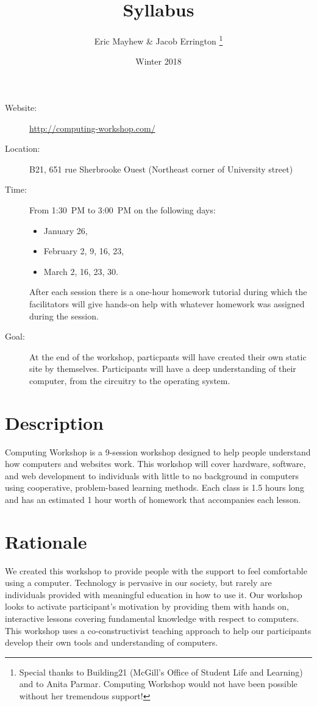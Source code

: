 \documentclass[11pt]{article}
\author{%
  Eric Mayhew \& Jacob Errington%
  \footnote{%
    Special thanks to Building21 (McGill's Office of Student Life and Learning)
    and to Anita Parmar.
    Computing Workshop would not have been possible without her tremendous
    support!
  }
}
\title{Syllabus}
\date{Winter 2018}
\begin{document}
\maketitle

\begin{description}
  \item[Website:]
    \url{http://computing-workshop.com/}

  \item[Location:]
    B21, 651 rue Sherbrooke Ouest
    (Northeast corner of University street)

  \item[Time:]
    From 1:30~PM to 3:00~PM on the following days:
    \begin{itemize}
      \item January 26,
      \item February 2, 9, 16, 23,
      \item March 2, 16, 23, 30.
    \end{itemize}

    After each session there is a one-hour homework tutorial during which the
    facilitators will give hands-on help with whatever homework was assigned
    during the session.

  \item[Goal:]
    At the end of the workshop, particpants will have created their own static
    site by themselves. Participants will have a deep understanding of their
    computer, from the circuitry to the operating system.
\end{description}

\section*{Description}

Computing Workshop is a 9-session workshop designed to help people understand
how computers and websites work. This workshop will cover hardware, software,
and web development to individuals with little to no background in computers
using cooperative, problem-based learning methods. Each class is 1.5 hours long
and has an estimated 1 hour worth of homework that accompanies each lesson.

\section*{Rationale}

We created this workshop to provide people with the support to feel comfortable
using a computer. Technology is pervasive in our society, but rarely are
individuals provided with meaningful education in how to use it. Our workshop
looks to activate participant's motivation by providing them with hands on,
interactive lessons covering fundamental knowledge with respect to computers.
This workshop uses a co-constructivist teaching approach to help our
participants develop their own tools and understanding of computers.
\end{document}
